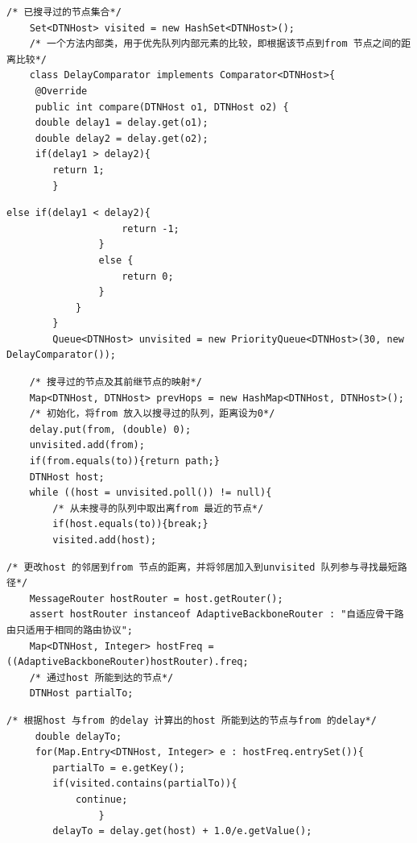 \documentclass[12pt,aspectratio=43,table]{beamer}
\begin{document}
\begin{frame}[fragile]
\begin{lstlisting}
/* 已搜寻过的节点集合*/
    Set<DTNHost> visited = new HashSet<DTNHost>();
    /* 一个方法内部类，用于优先队列内部元素的比较，即根据该节点到from 节点之间的距离比较*/
    class DelayComparator implements Comparator<DTNHost>{
     @Override
     public int compare(DTNHost o1, DTNHost o2) {
     double delay1 = delay.get(o1);
     double delay2 = delay.get(o2);
     if(delay1 > delay2){
        return 1;
        }
\end{lstlisting}
\end{frame}

\begin{frame}[fragile]
\begin{lstlisting}
else if(delay1 < delay2){
                    return -1;
                }
                else {
                    return 0;
                }
            }
        }
        Queue<DTNHost> unvisited = new PriorityQueue<DTNHost>(30, new DelayComparator());
\end{lstlisting}
\end{frame}

\begin{frame}[fragile]
\begin{lstlisting}
    /* 搜寻过的节点及其前继节点的映射*/
    Map<DTNHost, DTNHost> prevHops = new HashMap<DTNHost, DTNHost>();
    /* 初始化，将from 放入以搜寻过的队列，距离设为0*/
    delay.put(from, (double) 0);
    unvisited.add(from);
    if(from.equals(to)){return path;}
    DTNHost host;
    while ((host = unvisited.poll()) != null){
        /* 从未搜寻的队列中取出离from 最近的节点*/
        if(host.equals(to)){break;}
        visited.add(host);
\end{lstlisting}
\end{frame}

\begin{frame}[fragile]
\begin{lstlisting}
/* 更改host 的邻居到from 节点的距离，并将邻居加入到unvisited 队列参与寻找最短路径*/
    MessageRouter hostRouter = host.getRouter();
    assert hostRouter instanceof AdaptiveBackboneRouter : "自适应骨干路由只适用于相同的路由协议";
    Map<DTNHost, Integer> hostFreq = ((AdaptiveBackboneRouter)hostRouter).freq;
    /* 通过host 所能到达的节点*/
    DTNHost partialTo;
\end{lstlisting}
\end{frame}

\begin{frame}[fragile]
\begin{lstlisting}
/* 根据host 与from 的delay 计算出的host 所能到达的节点与from 的delay*/
     double delayTo;
     for(Map.Entry<DTNHost, Integer> e : hostFreq.entrySet()){
        partialTo = e.getKey();
        if(visited.contains(partialTo)){
            continue;
                }
        delayTo = delay.get(host) + 1.0/e.getValue();
\end{lstlisting}
\end{frame}
\end{document}
